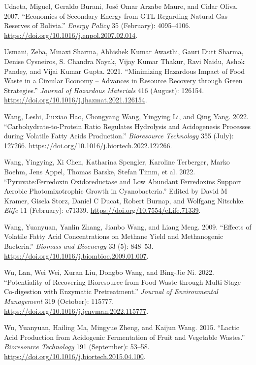 \documentclass[11pt]{report}
\begin{document}
\begin{hangparas}{1.5em}{1}
\hypertarget{citeproc_bib_item_78}{Udaeta, Miguel, Geraldo Burani, José Omar Arzabe Maure, and Cidar Oliva. 2007. “Economics of Secondary Energy from GTL Regarding Natural Gas Reserves of Bolivia.” \textit{Energy Policy} 35 (February): 4095–4106. \url{https://doi.org/10.1016/j.enpol.2007.02.014}.}

\hypertarget{citeproc_bib_item_79}{Usmani, Zeba, Minaxi Sharma, Abhishek Kumar Awasthi, Gauri Dutt Sharma, Denise Cysneiros, S. Chandra Nayak, Vijay Kumar Thakur, Ravi Naidu, Ashok Pandey, and Vijai Kumar Gupta. 2021. “Minimizing Hazardous Impact of Food Waste in a Circular Economy – Advances in Resource Recovery through Green Strategies.” \textit{Journal of Hazardous Materials} 416 (August): 126154. \url{https://doi.org/10.1016/j.jhazmat.2021.126154}.}

\hypertarget{citeproc_bib_item_80}{Wang, Leshi, Jiuxiao Hao, Chongyang Wang, Yingying Li, and Qing Yang. 2022. “Carbohydrate-to-Protein Ratio Regulates Hydrolysis and Acidogenesis Processes during Volatile Fatty Acids Production.” \textit{Bioresource Technology} 355 (July): 127266. \url{https://doi.org/10.1016/j.biortech.2022.127266}.}

\hypertarget{citeproc_bib_item_81}{Wang, Yingying, Xi Chen, Katharina Spengler, Karoline Terberger, Marko Boehm, Jens Appel, Thomas Barske, Stefan Timm, et al. 2022. “Pyruvate:Ferredoxin Oxidoreductase and Low Abundant Ferredoxins Support Aerobic Photomixotrophic Growth in Cyanobacteria.” Edited by David M Kramer, Gisela Storz, Daniel C Ducat, Robert Burnap, and Wolfgang Nitschke. \textit{Elife} 11 (February): e71339. \url{https://doi.org/10.7554/eLife.71339}.}

\hypertarget{citeproc_bib_item_82}{Wang, Yuanyuan, Yanlin Zhang, Jianbo Wang, and Liang Meng. 2009. “Effects of Volatile Fatty Acid Concentrations on Methane Yield and Methanogenic Bacteria.” \textit{Biomass and Bioenergy} 33 (5): 848–53. \url{https://doi.org/10.1016/j.biombioe.2009.01.007}.}

\hypertarget{citeproc_bib_item_83}{Wu, Lan, Wei Wei, Xuran Liu, Dongbo Wang, and Bing-Jie Ni. 2022. “Potentiality of Recovering Bioresource from Food Waste through Multi-Stage Co-digestion with Enzymatic Pretreatment.” \textit{Journal of Environmental Management} 319 (October): 115777. \url{https://doi.org/10.1016/j.jenvman.2022.115777}.}

\hypertarget{citeproc_bib_item_84}{Wu, Yuanyuan, Hailing Ma, Mingyue Zheng, and Kaijun Wang. 2015. “Lactic Acid Production from Acidogenic Fermentation of Fruit and Vegetable Wastes.” \textit{Bioresource Technology} 191 (September): 53–58. \url{https://doi.org/10.1016/j.biortech.2015.04.100}.}


\end{hangparas}
\end{document}
